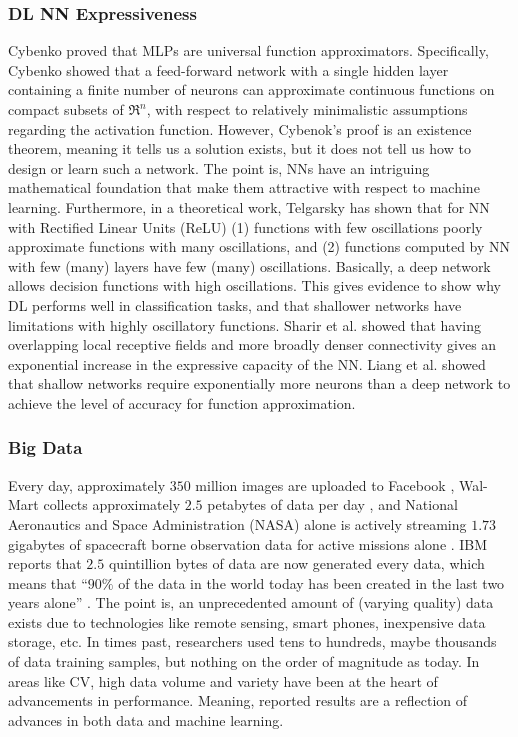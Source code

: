 \documentclass[12pt]{spieman}
\begin{document}
\begin{spacing}{1}
\subsubsection{DL NN Expressiveness}
Cybenko \cite{Cybenko1989} proved that MLPs are universal function approximators. Specifically, Cybenko showed that a feed-forward network with a single hidden layer containing a finite number of neurons can approximate continuous functions on compact subsets of $\Re^n$, with respect to relatively minimalistic assumptions regarding the activation function. However, Cybenok's proof is an existence theorem, meaning it tells us a solution exists, but it does not tell us how to design or learn such a network. The point is, NNs have an intriguing mathematical foundation that make them attractive with respect to machine learning. Furthermore, in a theoretical work, Telgarsky \cite{telgarsky2016benefits} has shown that for NN with Rectified Linear Units (ReLU) (1) functions with few oscillations poorly approximate functions with many oscillations, and (2) functions computed by NN with few (many) layers have few (many) oscillations. Basically, a deep network allows decision functions with high oscillations. This gives evidence to show why DL performs well in classification tasks, and that shallower networks have limitations with highly oscillatory functions. Sharir et al. \cite{sharir2017expressive} showed that having overlapping local receptive fields and more broadly denser connectivity gives an exponential increase in the expressive capacity of the NN. Liang et al. \cite{liang2016whydeep} showed that shallow networks require exponentially more neurons than a deep network to achieve the level of accuracy for function approximation.

\subsubsection{Big Data}\label{subsec:bigdatareview}
Every day, approximately $350$ million images are uploaded to Facebook \cite{Brown2015Deep} , Wal-Mart collects approximately $2.5$ petabytes of data per day \cite{Brown2015Deep} , and National Aeronautics and Space Administration (NASA) alone is actively streaming $1.73$ gigabytes of spacecraft borne observation data for active missions alone \cite{Ma201547}. IBM reports that $2.5$ quintillion bytes of data are now generated every data, which means that ``$90\%$ of the data in the world today has been created in the last two years alone'' \cite{7565634} . The point is, an unprecedented amount of (varying quality) data exists due to technologies like remote sensing, smart phones, inexpensive data storage, etc. In times past, researchers used tens to hundreds, maybe thousands of data training samples, but nothing on the order of magnitude as today. In areas like CV, high data volume and variety have been at the heart of advancements in performance. Meaning, reported results are a reflection of advances in both data and machine learning.


\end{spacing}
\end{document}
